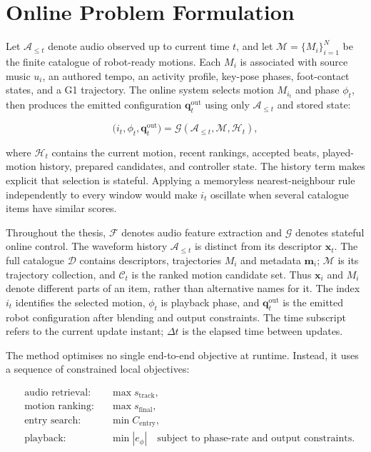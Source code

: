 \section{Online Problem Formulation}
\label{sec:ch5_problem}

Let $\mathcal{A}_{\leq t}$ denote audio observed up to current time $t$, and let
$\mathcal{M}=\{M_i\}_{i=1}^{N}$ be the finite catalogue of robot-ready
motions. Each $M_i$ is associated with source music $u_i$, an authored tempo,
an activity profile, key-pose phases, foot-contact states, and a G1 trajectory.
The online system selects motion $M_{i_t}$ and phase $\phi_t$, then produces
the emitted configuration $\mathbf{q}^{\mathrm{out}}_t$ using only
$\mathcal{A}_{\leq t}$ and stored state:

\begin{equation}
    \bigl(i_t,\phi_t,\mathbf{q}^{\mathrm{out}}_t\bigr)
    =\mathcal{G}\!\left(\mathcal{A}_{\leq t},\mathcal{M},\mathcal{H}_{t}\right),
    \label{eq:ch5_causal_mapping}
\end{equation}

where $\mathcal{H}_{t}$ contains the current motion, recent rankings, accepted
beats, played-motion history, prepared candidates, and controller state. The
history term makes explicit that selection is stateful. Applying a memoryless
nearest-neighbour rule independently to every window would make
$i_t$ oscillate when several catalogue items have similar scores.

Throughout the thesis, $\mathcal{F}$ denotes audio feature extraction and
$\mathcal{G}$ denotes stateful online control. The waveform history
$\mathcal{A}_{\leq t}$ is distinct from its descriptor $\mathbf{x}_t$.
The full catalogue $\mathcal{D}$ contains descriptors, trajectories $M_i$ and
metadata $\mathbf{m}_i$; $\mathcal{M}$ is its trajectory collection, and
$\mathcal{C}_t$ is the ranked motion candidate set. Thus $\mathbf{x}_i$ and
$M_i$ denote different parts of an item, rather than alternative names for it.
The index $i_t$ identifies the selected motion, $\phi_t$ is playback phase,
and $\mathbf{q}^{\mathrm{out}}_t$ is the emitted robot configuration after
blending and output constraints. The time subscript refers to the current
update instant; $\Delta t$ is the elapsed time between updates.

The method optimises no single end-to-end objective at runtime. Instead, it
uses a sequence of constrained local objectives:

\begin{equation}
\begin{aligned}
    &\text{audio retrieval:} &&\max s_{\mathrm{track}},\\
    &\text{motion ranking:}  &&\max s_{\mathrm{final}},\\
    &\text{entry search:}    &&\min C_{\mathrm{entry}},\\
    &\text{playback:}        &&\min |e_{\phi}|\quad
       \text{subject to phase-rate and output constraints}.
\end{aligned}
    \label{eq:ch5_local_objectives}
\end{equation}

